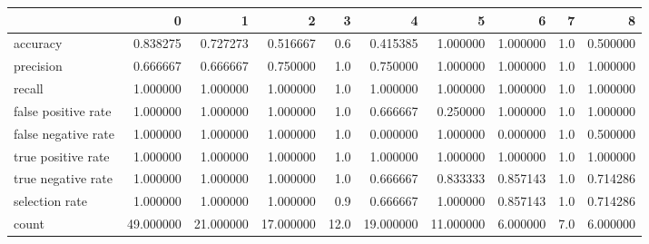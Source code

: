 \begin{tabular}{lrrrrrrrrr}
\toprule
{} &          0 &          1 &          2 &     3 &          4 &          5 &         6 &    7 &         8 \\
\midrule
accuracy            &   0.838275 &   0.727273 &   0.516667 &   0.6 &   0.415385 &   1.000000 &  1.000000 &  1.0 &  0.500000 \\
precision           &   0.666667 &   0.666667 &   0.750000 &   1.0 &   0.750000 &   1.000000 &  1.000000 &  1.0 &  1.000000 \\
recall              &   1.000000 &   1.000000 &   1.000000 &   1.0 &   1.000000 &   1.000000 &  1.000000 &  1.0 &  1.000000 \\
false positive rate &   1.000000 &   1.000000 &   1.000000 &   1.0 &   0.666667 &   0.250000 &  1.000000 &  1.0 &  1.000000 \\
false negative rate &   1.000000 &   1.000000 &   1.000000 &   1.0 &   0.000000 &   1.000000 &  0.000000 &  1.0 &  0.500000 \\
true positive rate  &   1.000000 &   1.000000 &   1.000000 &   1.0 &   1.000000 &   1.000000 &  1.000000 &  1.0 &  1.000000 \\
true negative rate  &   1.000000 &   1.000000 &   1.000000 &   1.0 &   0.666667 &   0.833333 &  0.857143 &  1.0 &  0.714286 \\
selection rate      &   1.000000 &   1.000000 &   1.000000 &   0.9 &   0.666667 &   1.000000 &  0.857143 &  1.0 &  0.714286 \\
count               &  49.000000 &  21.000000 &  17.000000 &  12.0 &  19.000000 &  11.000000 &  6.000000 &  7.0 &  6.000000 \\
\bottomrule
\end{tabular}
